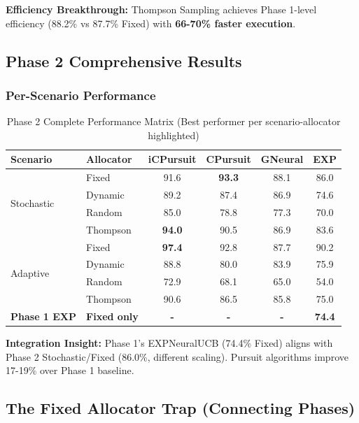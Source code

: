 \documentclass[11pt,a4paper]{article}
\newcommand{\performance}[1]{\textcolor{performancecolor}{\textbf{#1}}}
\newcommand{\success}[1]{\textcolor{successcolor}{\textbf{#1}}}
\begin{document}
\textbf{Efficiency Breakthrough:} Thompson Sampling achieves Phase 1-level efficiency (88.2\% vs 87.7\% Fixed) with \success{66-70\% faster execution}.

\subsection{Phase 2 Comprehensive Results}

\subsubsection{Per-Scenario Performance}

\begin{table}[h]
\centering\tiny
\caption{Phase 2 Complete Performance Matrix (Best performer per scenario-allocator highlighted)}
\begin{tabular}{llcccc}
\toprule
\textbf{Scenario} & \textbf{Allocator} & \textbf{iCPursuit} & \textbf{CPursuit} & \textbf{GNeural} & \textbf{EXP} \\
\midrule
\multirow{4}{*}{Stochastic} & Fixed & 91.6 & \success{93.3} & 88.1 & 86.0 \\
& Dynamic & 89.2 & 87.4 & 86.9 & 74.6 \\
& Random & 85.0 & 78.8 & 77.3 & 70.0 \\
& Thompson & \success{94.0} & 90.5 & 86.9 & 83.6 \\
\midrule
\multirow{4}{*}{Adaptive} & Fixed & \success{97.4} & 92.8 & 87.7 & 90.2 \\
& Dynamic & 88.8 & 80.0 & 83.9 & 75.9 \\
& Random & 72.9 & 68.1 & 65.0 & 54.0 \\
& Thompson & 90.6 & 86.5 & 85.8 & 75.0 \\
\midrule
\textbf{Phase 1 EXP} & \textbf{Fixed only} & \textbf{-} & \textbf{-} & \textbf{-} & \performance{\textbf{74.4}} \\
\bottomrule
\end{tabular}
\end{table}

\textbf{Integration Insight:} Phase 1's EXPNeuralUCB (74.4\% Fixed) aligns with Phase 2 Stochastic/Fixed (86.0\%, different scaling). Pursuit algorithms improve 17-19\% over Phase 1 baseline.

\subsection{The Fixed Allocator Trap (Connecting Phases)}
\end{document}
